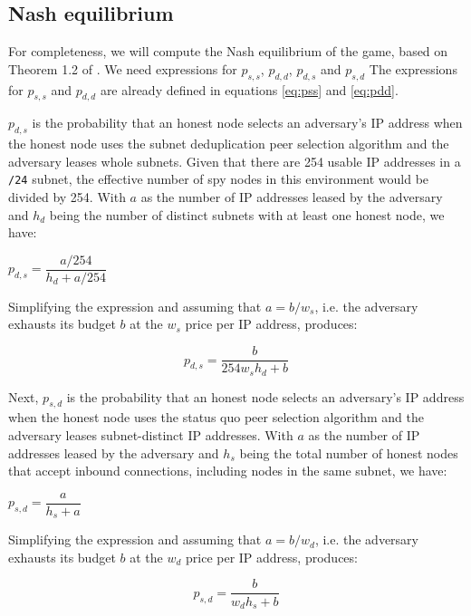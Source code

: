 \documentclass[english]{mrl}
\theoremstyle{plain}
\begin{document}
\subsection{Nash equilibrium}

For completeness, we will compute the Nash equilibrium of the game,
based on Theorem 1.2 of \cite{sun:hal-03852615}. We need expressions
for $p_{s,s}$, $p_{d,d}$, $p_{d,s}$ and $p_{s,d}$ The expressions
for $p_{s,s}$ and $p_{d,d}$ are already defined in equations \ref{eq:pss}
and \ref{eq:pdd}.

$p_{d,s}$ is the probability that an honest node selects an adversary's
IP address when the honest node uses the subnet deduplication peer
selection algorithm and the adversary leases whole subnets. Given
that there are 254 usable IP addresses in a \texttt{/24} subnet, the
effective number of spy nodes in this environment would be divided
by 254. With $a$ as the number of IP addresses leased by the adversary
and $h_{d}$ being the number of distinct subnets with at least one
honest node, we have: 

$p_{d,s}=\dfrac{a/254}{h_{d}+a/254}$ 

Simplifying the expression and assuming that $a=b/w_{s}$, i.e. the
adversary exhausts its budget $b$ at the $w_{s}$ price per IP address,
produces:

\begin{equation}
p_{d,s}=\dfrac{b}{254w_{s}h_{d}+b}\label{eq:pds}
\end{equation}

Next, $p_{s,d}$ is the probability that an honest node selects an
adversary's IP address when the honest node uses the status quo peer
selection algorithm and the adversary leases subnet-distinct IP addresses.
With $a$ as the number of IP addresses leased by the adversary and
$h_{s}$ being the total number of honest nodes that accept inbound
connections, including nodes in the same subnet, we have: 

$p_{s,d}=\dfrac{a}{h_{s}+a}$ 

Simplifying the expression and assuming that $a=b/w_{d}$, i.e. the
adversary exhausts its budget $b$ at the $w_{d}$ price per IP address,
produces:

\begin{equation}
p_{s,d}=\dfrac{b}{w_{d}h_{s}+b}\label{eq:psd}
\end{equation}
\end{document}
